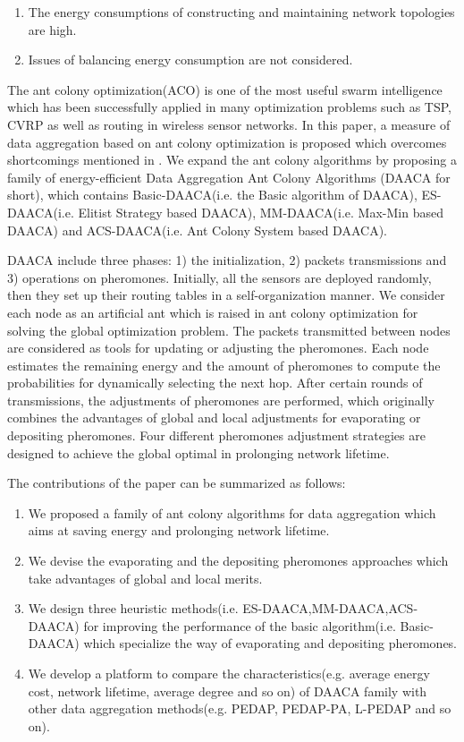 \documentclass{elsarticle}
\begin{document}
\begin{enumerate}
\item The energy consumptions of constructing and maintaining network topologies are high.
\item Issues of balancing energy consumption\cite{label-31, label-32} are not considered.
\end{enumerate}

The ant colony optimization(ACO)\cite{label-34} is one of the most useful swarm intelligence\cite{label-35} which has been
successfully applied in many optimization problems such as TSP\cite{label-36}, CVRP\cite{label-37} as well as routing in wireless sensor networks\cite{label-38,label-39,label-40}. In this paper, a measure of data aggregation based on ant colony optimization is proposed which overcomes shortcomings mentioned in \cite{label-16,label-13,label-14,label-15,label-17}. We expand the ant colony algorithms \cite{label-12} by proposing a family of energy-efficient Data Aggregation Ant Colony Algorithms (DAACA for short), which contains Basic-DAACA(i.e. the Basic algorithm of DAACA), ES-DAACA(i.e. Elitist Strategy based DAACA), MM-DAACA(i.e. Max-Min based DAACA) and ACS-DAACA(i.e. Ant Colony System based DAACA).

DAACA include three phases: 1) the initialization, 2) packets transmissions and 3) operations on pheromones. Initially, all the sensors are deployed randomly, then they set up their routing tables in a self-organization manner. We consider each node as an artificial ant which is raised in ant colony optimization for solving the global optimization problem. The packets transmitted between nodes are considered as tools for updating or adjusting the pheromones. Each node estimates the remaining energy and the amount of pheromones to compute the probabilities for dynamically selecting the next hop. After certain rounds of transmissions, the adjustments of pheromones are performed, which originally combines the advantages of global and local adjustments for evaporating or depositing pheromones. Four different pheromones adjustment strategies are designed to achieve the global optimal in prolonging network lifetime.

The contributions of the paper can be summarized as follows:
\begin{enumerate} \label{contribution}
\item We proposed a family of ant colony algorithms for data aggregation which aims at saving energy and prolonging network lifetime.
\item We devise the evaporating and the depositing pheromones approaches which take advantages of global and local merits.
\item We design three heuristic methods(i.e. ES-DAACA,MM-DAACA,ACS-DAACA) for improving the performance of the basic algorithm(i.e. Basic-DAACA) which specialize the way of evaporating and depositing pheromones.
\item We develop a platform to compare the characteristics(e.g. average energy cost, network lifetime, average degree and so on) of DAACA family with other data aggregation methods(e.g. PEDAP, PEDAP-PA, L-PEDAP and so on).
\end{enumerate}
\end{document}
